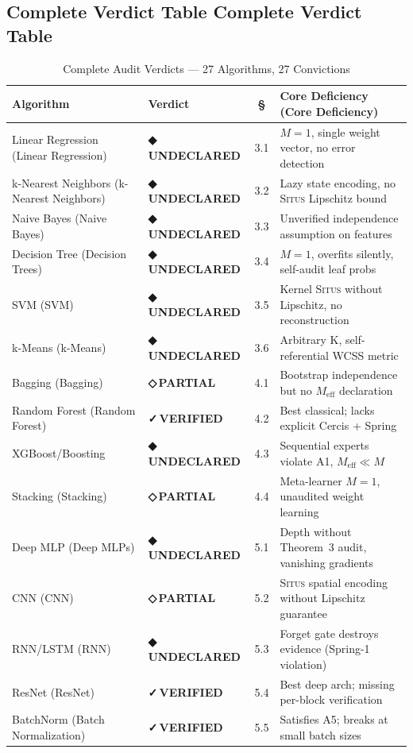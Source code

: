 \documentclass[12pt,a4paper]{article}
\theoremstyle{definition}
\newcommand{\guilty}{{\color{guiltycolor}\textbf{◆\,UNDECLARED}}}
\newcommand{\weakness}{{\color{weakcolor}\textbf{◇\,PARTIAL}}}
\newcommand{\verified}{{\color{verifiedcolor}\textbf{✓\,VERIFIED}}}
\newcommand{\Situs}{\textsc{Situs}}
\begin{document}
\subsection{Complete Verdict Table Complete Verdict Table}

\begin{table}[h]
\centering
\caption{Complete Audit Verdicts — 27 Algorithms, 27 Convictions}
\label{tab:all_verdicts}
\scriptsize
\begin{tabular}{p{3.2cm} p{1.5cm} c p{5.5cm}}
\toprule
\textbf{Algorithm} & \textbf{Verdict} & \textbf{§} & \textbf{Core Deficiency (Core Deficiency)} \\
\midrule
Linear Regression (Linear Regression) & \guilty{} & 3.1 & $M=1$, single weight vector, no error detection \\
k-Nearest Neighbors (k-Nearest Neighbors) & \guilty{} & 3.2 & Lazy state encoding, no \Situs{} Lipschitz bound \\
Naive Bayes (Naive Bayes) & \guilty{} & 3.3 & Unverified independence assumption on features \\
Decision Tree (Decision Trees) & \guilty{} & 3.4 & $M=1$, overfits silently, self-audit leaf probs \\
SVM (SVM) & \guilty{} & 3.5 & Kernel \Situs{} without Lipschitz, no reconstruction \\
k-Means (k-Means) & \guilty{} & 3.6 & Arbitrary K, self-referential WCSS metric \\
Bagging (Bagging) & \weakness{} & 4.1 & Bootstrap independence but no $M_{\text{eff}}$ declaration \\
Random Forest (Random Forest) & \verified{} & 4.2 & Best classical; lacks explicit Cercis + Spring \\
XGBoost/Boosting & \guilty{} & 4.3 & Sequential experts violate A1, $M_{\text{eff}} \ll M$ \\
Stacking (Stacking) & \weakness{} & 4.4 & Meta-learner $M=1$, unaudited weight learning \\
Deep MLP (Deep MLPs) & \guilty{} & 5.1 & Depth without Theorem~3 audit, vanishing gradients \\
CNN (CNN) & \weakness{} & 5.2 & \Situs{} spatial encoding without Lipschitz guarantee \\
RNN/LSTM (RNN) & \guilty{} & 5.3 & Forget gate destroys evidence (Spring-1 violation) \\
ResNet (ResNet) & \verified{} & 5.4 & Best deep arch; missing per-block verification \\
BatchNorm (Batch Normalization) & \verified{} & 5.5 & Satisfies A5; breaks at small batch sizes \\

\end{tabular}
\end{table}
\end{document}
